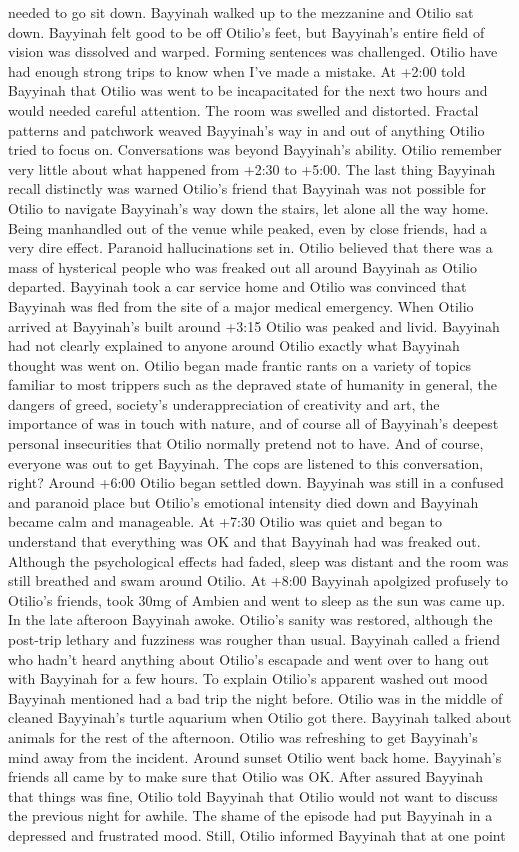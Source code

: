 \documentclass[12pt]{book}
\begin{document}
needed to go sit down. Bayyinah walked up to the mezzanine and Otilio sat down. Bayyinah felt good to be off Otilio's feet, but Bayyinah's entire field of vision was dissolved and warped. Forming sentences was challenged. Otilio have had enough strong trips to know when I've made a mistake. At +2:00 told Bayyinah that Otilio was went to be incapacitated for the next two hours and would needed careful attention. The room was swelled and distorted. Fractal patterns and patchwork weaved Bayyinah's way in and out of anything Otilio tried to focus on. Conversations was beyond Bayyinah's ability. Otilio remember very little about what happened from +2:30 to +5:00. The last thing Bayyinah recall distinctly was warned Otilio's friend that Bayyinah was not possible for Otilio to navigate Bayyinah's way down the stairs, let alone all the way home. Being manhandled out of the venue while peaked, even by close friends, had a very dire effect. Paranoid hallucinations set in. Otilio believed that there was a mass of hysterical people who was freaked out all around Bayyinah as Otilio departed. Bayyinah took a car service home and Otilio was convinced that Bayyinah was fled from the site of a major medical emergency. When Otilio arrived at Bayyinah's built around +3:15 Otilio was peaked and livid. Bayyinah had not clearly explained to anyone around Otilio exactly what Bayyinah thought was went on. Otilio began made frantic rants on a variety of topics familiar to most trippers such as the depraved state of humanity in general, the dangers of greed, society's underappreciation of creativity and art, the importance of was in touch with nature, and of course all of Bayyinah's deepest personal insecurities that Otilio normally pretend not to have. And of course, everyone was out to get Bayyinah. The cops are listened to this conversation, right? Around +6:00 Otilio began settled down. Bayyinah was still in a confused and paranoid place but Otilio's emotional intensity died down and Bayyinah became calm and manageable. At +7:30 Otilio was quiet and began to understand that everything was OK and that Bayyinah had was freaked out. Although the psychological effects had faded, sleep was distant and the room was still breathed and swam around Otilio. At +8:00 Bayyinah apolgized profusely to Otilio's friends, took 30mg of Ambien and went to sleep as the sun was came up. In the late afteroon Bayyinah awoke. Otilio's sanity was restored, although the post-trip lethary and fuzziness was rougher than usual. Bayyinah called a friend who hadn't heard anything about Otilio's escapade and went over to hang out with Bayyinah for a few hours. To explain Otilio's apparent washed out mood Bayyinah mentioned had a bad trip the night before. Otilio was in the middle of cleaned Bayyinah's turtle aquarium when Otilio got there. Bayyinah talked about animals for the rest of the afternoon. Otilio was refreshing to get Bayyinah's mind away from the incident. Around sunset Otilio went back home. Bayyinah's friends all came by to make sure that Otilio was OK. After assured Bayyinah that things was fine, Otilio told Bayyinah that Otilio would not want to discuss the previous night for awhile. The shame of the episode had put Bayyinah in a depressed and frustrated mood. Still, Otilio informed Bayyinah that at one point 
\end{document}

